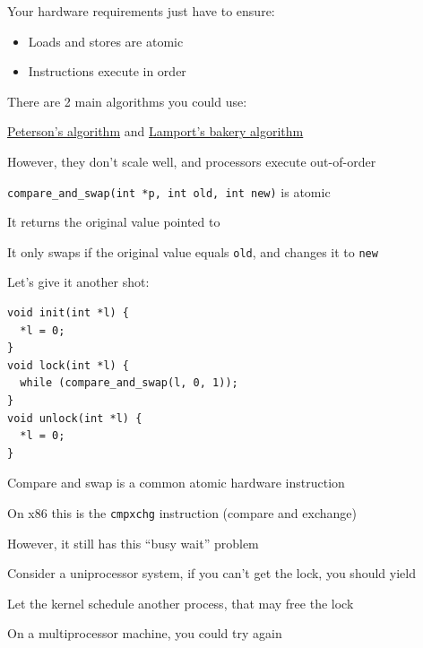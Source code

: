 \begin{slide}


    Your hardware requirements just have to ensure:
    \begin{itemize}
      \item Loads and stores are atomic
      \item Instructions execute in order
    \end{itemize}
    \medskip

    There are 2 main algorithms you could use:
    
    \leftspace{}\href{https://en.wikipedia.org/wiki/Peterson\%27s_algorithm}
    {Peterson's algorithm}
    and
    \href{http://en.wikipedia.org/wiki/Lamport\%27s_bakery_algorithm}
         {Lamport's bakery algorithm}
    \medskip

    However, they don't scale well, and processors execute
    out-of-order

  \end{slide}

  \begin{slide}


    \texttt{compare\_and\_swap(int *p, int old, int new)} is atomic

    \leftspace{}It returns the original value pointed to

    \leftspace{}It only swaps if the original value equals \texttt{old}, and changes it to \texttt{new}
    \medskip

    Let's give it another shot:

    \begin{verbatim}
void init(int *l) {
  *l = 0;
}
void lock(int *l) {
  while (compare_and_swap(l, 0, 1));
}
void unlock(int *l) {
  *l = 0;
}   
    \end{verbatim}

  \end{slide}

  \begin{slide}


    Compare and swap is a common atomic hardware instruction
    \medskip

    On x86 this is the \texttt{cmpxchg} instruction (compare and exchange)
    \medskip

    However, it still has this ``busy wait'' problem
    \medskip

    Consider a uniprocessor system, if you can't get the lock, you should yield

    \leftspace{}Let the kernel schedule another process, that may free the lock
    \medskip

    On a multiprocessor machine, you could try again

  \end{slide}

